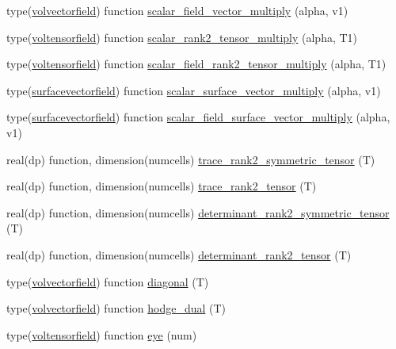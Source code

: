 \begin{DoxyCompactItemize}
\item 
type(\hyperlink{structtensor__fields_1_1volvectorfield}{volvectorfield}) function \hyperlink{classtensor__fields_af2d1f619a7f9e13e00a6e16d963cc1e0}{scalar\-\_\-field\-\_\-vector\-\_\-multiply} (alpha, v1)
\item 
type(\hyperlink{structtensor__fields_1_1voltensorfield}{voltensorfield}) function \hyperlink{classtensor__fields_af18bb543f46054600858b3053879a712}{scalar\-\_\-rank2\-\_\-tensor\-\_\-multiply} (alpha, T1)
\item 
type(\hyperlink{structtensor__fields_1_1voltensorfield}{voltensorfield}) function \hyperlink{classtensor__fields_a29f787f36489c2f75b44da3bf2e03dc2}{scalar\-\_\-field\-\_\-rank2\-\_\-tensor\-\_\-multiply} (alpha, T1)
\item 
type(\hyperlink{structtensor__fields_1_1surfacevectorfield}{surfacevectorfield}) function \hyperlink{classtensor__fields_a15ea7dab8fbb47c9dcaeedd06c5146ac}{scalar\-\_\-surface\-\_\-vector\-\_\-multiply} (alpha, v1)
\item 
type(\hyperlink{structtensor__fields_1_1surfacevectorfield}{surfacevectorfield}) function \hyperlink{classtensor__fields_a8cf54f343ca8dd0bb7cd0cc54893a178}{scalar\-\_\-field\-\_\-surface\-\_\-vector\-\_\-multiply} (alpha, v1)
\item 
real(dp) function, dimension(numcells) \hyperlink{classtensor__fields_a57a0de2bfe252ee1b97d44dc27e79773}{trace\-\_\-rank2\-\_\-symmetric\-\_\-tensor} (T)
\item 
real(dp) function, dimension(numcells) \hyperlink{classtensor__fields_afd2f60e74c8a7a224bd427fb4ad7f324}{trace\-\_\-rank2\-\_\-tensor} (T)
\item 
real(dp) function, dimension(numcells) \hyperlink{classtensor__fields_af14cdaf7386ebab18c893da974420189}{determinant\-\_\-rank2\-\_\-symmetric\-\_\-tensor} (T)
\item 
real(dp) function, dimension(numcells) \hyperlink{classtensor__fields_aaeb381f9f7f285dd63add0a112fcb987}{determinant\-\_\-rank2\-\_\-tensor} (T)
\item 
type(\hyperlink{structtensor__fields_1_1volvectorfield}{volvectorfield}) function \hyperlink{classtensor__fields_a8101b88f322c248436c97f3f5a0e3996}{diagonal} (T)
\item 
type(\hyperlink{structtensor__fields_1_1volvectorfield}{volvectorfield}) function \hyperlink{classtensor__fields_a59d6ea682885cb4acb8d46129bc9d92c}{hodge\-\_\-dual} (T)
\item 
type(\hyperlink{structtensor__fields_1_1voltensorfield}{voltensorfield}) function \hyperlink{classtensor__fields_aac106b13779602c59f2e77ffd8b70455}{eye} (num)

\end{DoxyCompactItemize}
